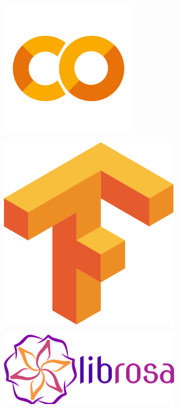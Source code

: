 \begin{figure}[H]
	\begin{subfigure}{.25\textwidth}
		\centering
		\includegraphics[width=.7\linewidth]{img/colab_logo.png}
		\label{fig:colab_logo}
	\end{subfigure}%
	\begin{subfigure}{.25\textwidth}
		\centering
		\includegraphics[width=.6\linewidth]{img/tensorflow_logo.png}
		\label{fig:tensorflow_logo}
	\end{subfigure}%
	\begin{subfigure}{.25\textwidth}
		\centering
		\includegraphics[width=1.1\linewidth]{img/librosa_logo.png}

\end{subfigure}
\end{figure}
